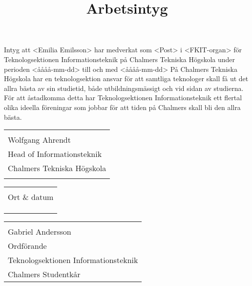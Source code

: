 \documentclass[11pt, noincludeaddress, nopagination]{classes/cthit}
\makeatletter
\newcommand{\sign}[4]{%
  \begin{tabular}[t]{@{}l@{}}
  \makebox[6.5cm]{\dotfill}\\
  \strut#1\strut \\
  \strut#2\strut \\
  \strut#3\strut \\
  \strut#4\strut \\
  \end{tabular}%
}
\makeatother
\begin{document}
\title{Arbetsintyg}

\makeheadfoot%

\makesimpletitle

\subsection*{}
Intyg att <Emilia Emilsson> har medverkat som <Post> i <FKIT-organ> för Teknologsektionen Informationsteknik på Chalmers Tekniska Högskola under perioden <åååå-mm-dd> till och med <åååå-mm-dd> På Chalmers Tekniska Högskola har en teknologsektion ansvar för att samtliga teknologer skall få ut det allra bästa av sin studietid, både utbildningsmässigt och vid sidan av studierna. För att åstadkomma detta har Teknologsektionen Informationsteknik ett flertal olika ideella föreningar som jobbar för att tiden på Chalmers skall bli den allra bästa. 

\vspace{5cm} 

\noindent
  \begin{minipage}[t]{0.5\linewidth}
    \raggedright
    \sign{Wolfgang Ahrendt}{Head of Informationsteknik}{Chalmers Tekniska Högskola}{}
  \end{minipage}%
  \hfill
  \begin{minipage}[t]{0.5\linewidth}
  \sign{Ort \& datum}{}{}{}
  \end{minipage}

  \vspace{1cm}
  \noindent

  \begin{minipage}[t]{0.5\linewidth}
    \raggedright
    \sign{Gabriel Andersson}{Ordförande}{Teknologsektionen Informationsteknik}{Chalmers Studentkår}
  \end{minipage}%
  \hfill
  \begin{minipage}[t]{0.5\linewidth}
  
  \end{minipage}
\end{document}
